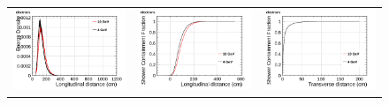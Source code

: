\begin{figure}[htp]
  \centering
  \label{fig:containment}
  
  \begin{tabular}{ccc}
    \includegraphics[scale=0.15]{figures/electrons_density_overlay}&
    \includegraphics[scale=0.15]{figures/electrons_lcont_overlay}&
    \includegraphics[scale=0.15]{figures/electrons_wcont_overlay}\\
 

\end{tabular}
\end{figure}
